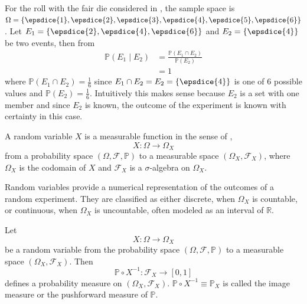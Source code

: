 \begin{example}
	For the roll with the fair die considered in , the sample space is $\Omega = \{ \epsdice{1}, \epsdice{2}, \epsdice{3}, \epsdice{4}, \epsdice{5}, \epsdice{6} \}$. Let $E_1 = \{\epsdice{2}, \epsdice{4}, \epsdice{6}\}$ and $E_2 = \{\epsdice{4}\}$ be two events, then from 
	\begin{equation}
		\begin{split}
			\mathbb{P}(E_1\mid E_2) &= \frac{\mathbb{P}(E_1 \cap E_2)}{\mathbb{P}(E_2)}\\
			& = 1
		\end{split}
	\end{equation}
	where $\mathbb{P}(E_1 \cap E_2)= \frac{1}{6}$ since $E_1\cap E_2 = E_2=\{\epsdice{4}\}$ is one of $6$ possible values and $\mathbb{P}(E_2) = \frac{1}{6}$. Intuitively this makes sense because $E_2$ is a set with one member and since $E_2$ is known, the outcome of the experiment is known with certainty in this case.
\end{example}

\begin{definition}
	\label{def:random_Variable}
	A random variable $X$ is a measurable function in the sense of ,
	\begin{equation}
		X\colon \Omega \to \Omega_X
	\end{equation}
	from a probability space $(\Omega, \mathcal{F}, \mathbb{P})$ to a measurable space $(\Omega_X, \mathcal{F}_X)$, where $\Omega_X$ is the codomain of $X$ and $\mathcal{F}_X$ is a $\sigma$-algebra on $\Omega_X$.
\end{definition}

\begin{remark}
	Random variables provide a numerical representation of the outcomes of a random experiment.  
	They are classified as either discrete, when $\Omega_X$ is countable, or continuous, when $\Omega_X$ is uncountable, often modeled as an interval of $\mathbb{R}$.
\end{remark}

\begin{definition}
	\label{def:image_measure}
	Let 
	\begin{equation}
		X\colon \Omega \to \Omega_X
	\end{equation}
	be a random variable from the probability space $(\Omega, \mathcal{F}, \mathbb{P})$ to a measurable space $(\Omega_X, \mathcal{F}_X)$. Then~\cite{drewitz2019introduction}
	\begin{equation}
		\mathbb{P}\circ X^{-1}\colon \mathcal{F}_X\to [0,1]
	\end{equation}
	defines a probability measure on $(\Omega_X, \mathcal{F}_X)$. $\mathbb{P}\circ X^{-1} \equiv \mathbb{P}_X$ is called the image measure or the pushforward measure of $\mathbb{P}$.
\end{definition}


